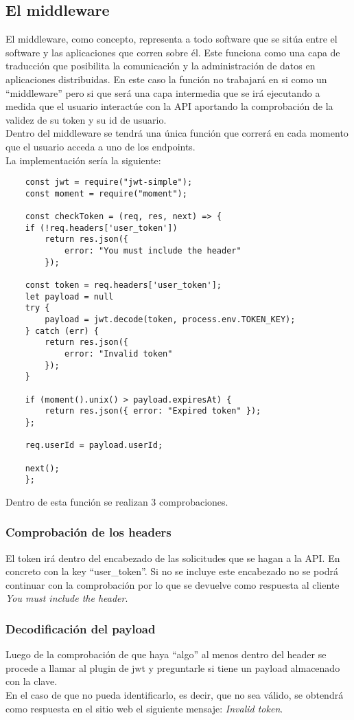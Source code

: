 \subsection{El middleware}
El middleware, como concepto, representa a todo software que se sitúa entre el software y las aplicaciones que corren sobre él. Este funciona como una capa de traducción que posibilita la comunicación y la administración de datos en aplicaciones distribuidas. En este caso la función no trabajará en si como un ``middleware'' pero si que será una capa intermedia que se irá ejecutando a medida que el usuario interactúe con la API aportando la comprobación de la validez de su token y su id de usuario.
\\Dentro del middleware se tendrá una única función que correrá en cada momento que el usuario acceda a uno de los endpoints.
\\La implementación sería la siguiente:
\begin{verbatim}
    const jwt = require("jwt-simple");
    const moment = require("moment");

    const checkToken = (req, res, next) => {
    if (!req.headers['user_token'])
        return res.json({
            error: "You must include the header"
        });

    const token = req.headers['user_token'];
    let payload = null
    try {
        payload = jwt.decode(token, process.env.TOKEN_KEY);
    } catch (err) {
        return res.json({
            error: "Invalid token"
        });
    }

    if (moment().unix() > payload.expiresAt) {
        return res.json({ error: "Expired token" });
    };

    req.userId = payload.userId;

    next();
    };
\end{verbatim}
Dentro de esta función se realizan 3 comprobaciones.

\subsubsection{Comprobación de los headers}
El token irá dentro del encabezado de las solicitudes que se hagan a la API. En concreto con la key ``user\_token''. Si no se incluye este encabezado no se podrá continuar con la comprobación por lo que se devuelve como respuesta al cliente \textit{You must include the header}.

\subsubsection{Decodificación del payload}
Luego de la comprobación de que haya ``algo'' al menos dentro del header se procede a llamar al plugin de jwt y preguntarle si tiene un payload almacenado con la clave.
\\En el caso de que no pueda identificarlo, es decir, que no sea válido, se obtendrá como respuesta en el sitio web el siguiente mensaje: \textit{Invalid token}.

